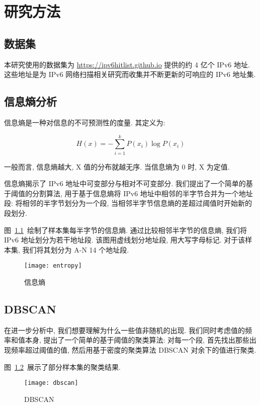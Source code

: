 \chapter{研究方法}
\label{cha:methods}

\section{数据集}

本研究使用的数据集为 \href{https://ipv6hitlist.github.io}{https://ipv6hitlist.github.io} 提供的约 4 亿个 IPv6 地址. 这些地址是为 IPv6 网络扫描相关研究而收集并不断更新的可响应的 IPv6 地址集.

\section{信息熵分析}

信息熵是一种对信息的不可预测性的度量. 其定义为:

$$H(x) = - \sum\limits_{i=1}^{k} P(x_i) \log P(x_i)$$

一般而言, 信息熵越大, X 值的分布就越无序. 当信息熵为 0 时, X 为定值.

信息熵揭示了 IPv6 地址中可变部分与相对不可变部分. 我们提出了一个简单的基于阈值的分割算法, 用于基于信息熵将 IPv6 地址中相邻的半字节合并为一个地址段: 将相邻的半字节划分为一个段, 当相邻半字节信息熵的差超过阈值时开始新的段划分.

图~\ref{fig:entropy}~绘制了样本集每半字节的信息熵. 通过比较相邻半字节的信息熵, 我们将 IPv6 地址划分为若干地址段. 该图用虚线划分地址段, 用大写字母标记. 对于该样本集, 我们将其划分为 A-N 14 个地址段.

\begin{figure}[htbp]
\centering
\texttt{[image: entropy]}
\caption{信息熵}
\label{fig:entropy}
\end{figure}

\section{DBSCAN}

在进一步分析中, 我们想要理解为什么一些值非随机的出现. 我们同时考虑值的频率和值本身, 提出了一个简单的基于阈值的聚类算法: 对每一个段, 首先找出那些出现频率超过阈值的值, 然后用基于密度的聚类算法 DBSCAN 对余下的值进行聚类.

图~\ref{fig:dbscan}~展示了部分样本集的聚类结果.

\begin{figure}[htbp]
\centering
\texttt{[image: dbscan]}
\caption{DBSCAN}
\label{fig:dbscan}
\end{figure}

